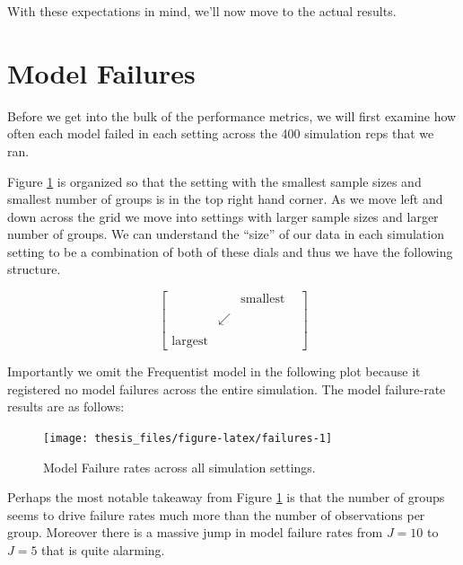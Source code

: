 \documentclass[12pt,twoside]{reedthesis}
\begin{document}
With these expectations in mind, we'll now move to the actual results.

\hypertarget{model-failures}{%
\section{Model Failures}\label{model-failures}}

Before we get into the bulk of the performance metrics, we will first examine how often each model failed in each setting across the 400 simulation reps that we ran.

Figure \ref{fig:failures} is organized so that the setting with the smallest sample sizes and smallest number of groups is in the top right hand corner. As we move left and down across the grid we move into settings with larger sample sizes and larger number of groups. We can understand the ``size'' of our data in each simulation setting to be a combination of both of these dials and thus we have the following structure.

\[
\begin{bmatrix}
 &  & \text{smallest} \\
 & & & \\
 & \swarrow &  \\
 & & & \\
\text{largest} & & 
\end{bmatrix}
\]

Importantly we omit the Frequentist model in the following plot because it registered no model failures across the entire simulation. The model failure-rate results are as follows:
\begin{figure}

{\centering \texttt{[image: thesis\_files/figure-latex/failures-1]} 

}

\caption{Model Failure rates across all simulation settings.}\label{fig:failures}
\end{figure}
Perhaps the most notable takeaway from Figure \ref{fig:failures} is that the number of groups seems to drive failure rates much more than the number of observations per group. Moreover there is a massive jump in model failure rates from \(J = 10\) to \(J = 5\) that is quite alarming.
\end{document}
